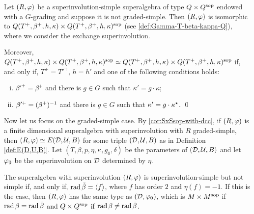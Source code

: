 \begin{thm}\label{thm:QxQ-type-I}
    Let $(R, \varphi)$ be a superinvolution-simple superalgebra of type $Q\times Q^{\mathrm{sop}}$ endowed with a $G$-grading and suppose it is not graded-simple. 
    Then $(R, \varphi)$ is isomorphic to $Q (T^+, \beta^+, h, \kappa) \times Q (T^+, \beta^+, h, \kappa)^{\mathrm{sop}}$ (see \cref{def:Gamma-T-beta-kappa-Q}), where we consider the exchange superinvolution. 
    
    \noindent
    Moreover, $Q (T^+, \beta^+, h, \kappa) \times Q (T^+, \beta^+, h, \kappa)^{\mathrm{sop}} \simeq Q (T^+, \beta^+, h, \kappa) \times Q (T^+, \beta^+, h, \kappa)^{\mathrm{sop}}$ if, and only if, $T^+ = T'^+$, $h = h'$ and one of the following conditions holds: 
    \begin{enumerate}[(i)]
	    \item $\beta'^+ = \beta^+$ and there is $g\in G$ such that $\kappa' = g \cdot \kappa$;
	    \item $\beta'^+ = (\beta^+)^{-1}$ and there is $g\in G$ such that $\kappa' = g \cdot \kappa^\star$. \qed
	\end{enumerate}
\end{thm}

Now let us focus on the graded-simple case. 
By \cref{cor:SxSsop-with-dcc}, if $(R, \varphi)$ is a finite dimensional superalgebra with superinvolution with $R$ graded-simple, then $(R, \varphi) \simeq E(\mathcal{D}, \mathcal U, B)$ for some triple $(\mathcal{D}, \mathcal U, B)$ as in Definition \ref{def:E(D,U,B)}. 
Let $(T, \beta, p, \eta, \kappa, g_0, \delta)$ be the parameters of $(\mathcal{D}, \mathcal U, B)$ and let $\varphi_0$ be the superinvolution on $\mathcal{D}$ determined by $\eta$. 



\begin{prop}\label{prop:types-of-D-via-rad-beta}
    The superalgebra with superinvolution $(R, \varphi)$ is superinvolution-simple but not simple if, and only if, $\operatorname{rad} \tilde\beta = \langle f \rangle$, where $f$ has order $2$ and $\eta(f) = -1$.
    If this is the case, then $(R, \varphi)$ has the same type as $(\mathcal{D}, \varphi_0)$, which is $M\times M^{\mathrm{sop}}$ if $\operatorname{rad} \beta = \operatorname{rad} \tilde\beta$ and $Q\times Q^{\mathrm{sop}}$ if $\operatorname{rad} \beta \neq \operatorname{rad} \tilde\beta$. 
\end{prop}

